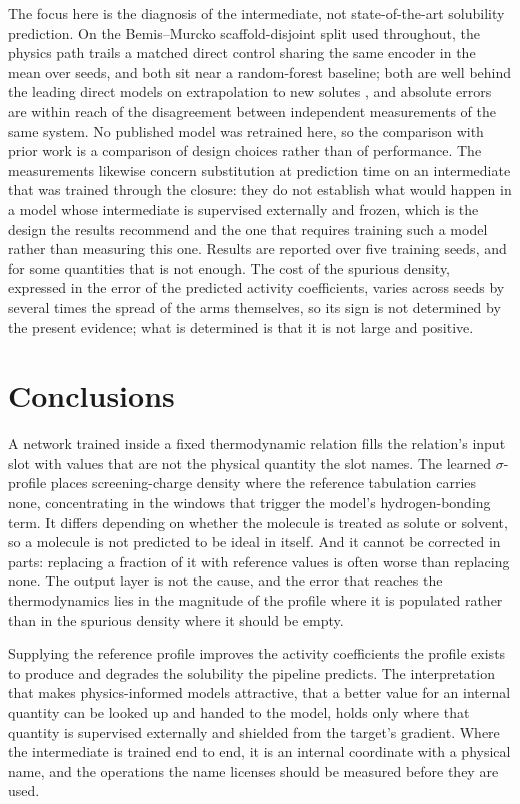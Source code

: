The focus here is the diagnosis of the intermediate, not state-of-the-art solubility prediction. On
the Bemis--Murcko scaffold-disjoint split used throughout, the physics path trails a matched direct
control sharing the same encoder in the mean over seeds, and both sit near a random-forest
baseline; both are well behind the leading direct models on extrapolation to new solutes
\cite{osanloo2024}, and absolute errors are within reach of the disagreement between independent
measurements of the same system. No published model was retrained here, so the comparison with
prior work is a comparison of design choices rather than of performance. The measurements likewise
concern substitution at prediction time on an intermediate that was trained through the closure:
they do not establish what would happen in a model whose intermediate is supervised externally and
frozen, which is the design the results recommend and the one that requires training such a model
rather than measuring this one. Results are reported over five training seeds, and for some
quantities that is not enough. The cost of the spurious density, expressed in the error of the
predicted activity coefficients, varies across seeds by several times the spread of the arms
themselves, so its sign is not determined by the present evidence; what is determined is that it is
not large and positive.

\section{Conclusions}
\label{sec:conclusions}

A network trained inside a fixed thermodynamic relation fills the relation's input slot with
values that are not the physical quantity the slot names. The learned $\sigma$-profile places
screening-charge density where the reference tabulation carries none, concentrating in the windows
that trigger the model's hydrogen-bonding term. It differs depending on whether the molecule is
treated as solute or solvent, so a molecule is not predicted to be ideal in itself. And it cannot
be corrected in parts: replacing a fraction of it with reference values is often worse than
replacing none. The output layer is not the cause, and the error that reaches the thermodynamics
lies in the magnitude of the profile where it is populated rather than in the spurious density
where it should be empty.

Supplying the reference profile improves the activity coefficients the profile exists to produce
and degrades the solubility the pipeline predicts. The interpretation that makes physics-informed
models attractive, that a better value for an internal quantity can be looked up and handed to the
model, holds only where that quantity is supervised externally and shielded from the target's
gradient. Where the intermediate is trained end to end, it is an internal coordinate with a
physical name, and the operations the name licenses should be measured before they are used.